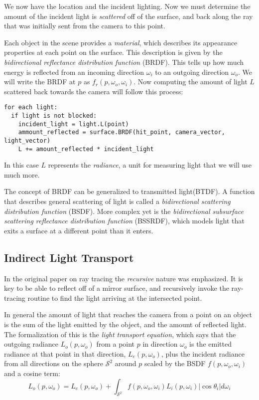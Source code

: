 \documentclass[
]{book}
\begin{document}
We now have the location and the incident lighting. Now we must determine the
amount of the incident light is \emph{scattered} off of the surface, and back along
the ray that was initially sent from the camera to this point.

Each object in the scene provides a \emph{material}, which describes its appearance
properties at each point on the surface. This description is given by the
\emph{bidirectional reflectance distribution function} (BRDF). This tells up how
much energy is reflected from an incoming direction \(\omega_i\) to an outgoing
direction \(\omega_o\). We will write the BRDF at \(p\) as
\(f_r\left(p,\omega_o,\omega_i\right)\). Now computing the amount of light \(L\)
scattered back towards the camera will follow this process:

\begin{verbatim}
for each light:
  if light is not blocked:
    incident_light = light.L(point)
    ammount_reflected = surface.BRDF(hit_point, camera_vector, light_vector)
    L += amount_reflected * incident_light
\end{verbatim}

In this case \(L\) represents the \emph{radiance}, a unit for measuring light that we
will use much more.

The concept of BRDF can be generalized to transmitted light(BTDF). A function
that describes general scattering of light is called a \emph{bidirectional
scattering distribution function} (BSDF). More complex yet is the \emph{bidirectional
subsurface scattering reflectance distribution function} (BSSRDF), which models
light that exits a surface at a different point than it enters.

\hypertarget{indirect-light-transport}{%
\subsection{Indirect Light Transport}\label{indirect-light-transport}}

In the original paper on ray tracing the \emph{recursive} nature was emphasized.
It is key to be able to reflect off of a mirror surface, and recursively invoke
the ray-tracing routine to find the light arriving at the intersected point.

In general the amount of light that reaches the camera from a point on an
object is the sum of the light emitted by the object, and the amount of
reflected light. The formalization of this is the \emph{light transport equation},
which says that the outgoing radiance \(L_o\left(p,\omega_o\right)\) from a point
\(p\) in direction \(\omega_o\) is the emitted radiance at that point in that
direction, \(L_e\left(p,\omega_o\right)\), plus the incident radiance from all
directions on the sphere \(\mathcal{S}^2\) around \(p\) scaled by the BSDF
\(f\left(p,\omega_o,\omega_i\right)\) and a cosine term:
\[
L_o\left(p,\omega_o\right)=L_e\left(p,\omega_o\right)+\int_{\mathcal{S}^2}f\left(p,\omega_o,\omega_i\right)L_i\left(p,\omega_i\right)\left|\cos\theta_i\right|d\omega_i
\label{eq:lightTransportEquation}
\]
\end{document}
